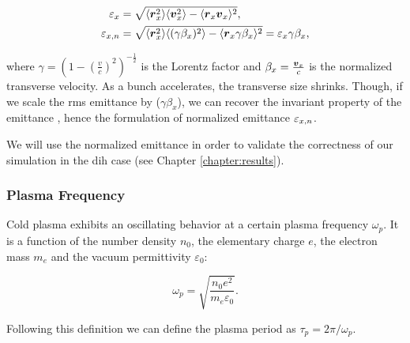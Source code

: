 \begin{align}
    \label{eq:rmsEmittance}
    \varepsilon_{x} &= \sqrt{\langle {\boldsymbol{r}_x^2} \rangle \langle {\boldsymbol{v}_x^2} \rangle - \langle {\boldsymbol{r}_x \boldsymbol{v}_x} \rangle^2}, \\
\varepsilon_{x,n} &= \sqrt{\langle {\boldsymbol{r}_x^2} \rangle \langle {(\gamma \beta_x)^2} \rangle - \langle {\boldsymbol{r}_x \gamma
    \beta_x} \rangle^2} = \varepsilon_{x} \gamma \beta_x,
\end{align}

where $\gamma = \left({1 - \left( \frac{v}{c} \right)^2} \right)^{-\frac{1}{2}}$ is the Lorentz factor and $\beta_x =
\frac{\boldsymbol{v}_x}{c}$ is the normalized transverse velocity.
As a bunch accelerates, the transverse size shrinks. Though, if we scale the \gls{rms} emittance by ($\gamma
\beta_x$), we can recover the invariant property of the emittance \cite{emittanceFloettmann}, hence
the formulation of normalized emittance $\varepsilon_{x,n}$.

We will use the normalized emittance in order to validate the correctness of our simulation in
the \gls{dih} case (see Chapter \ref{chapter:results}).

\subsubsection{Plasma Frequency}

Cold plasma exhibits an oscillating behavior at a certain plasma frequency $\omega_p$.
It is a function of the number density $n_0$, the elementary charge $e$,
the electron mass $m_e$ and the vacuum permittivity $\varepsilon_0$:

\begin{equation}
    \omega_p = \sqrt{\frac{n_0 e^2}{m_e \varepsilon_0}}.
    \label{eq:plasmaFrequency}
\end{equation}

Following this definition we can define the plasma period as $\tau_p = 2\pi / \omega_p$.



